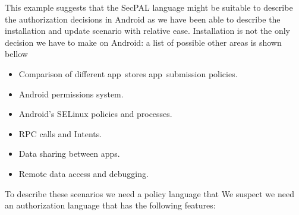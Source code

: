 \documentclass[a4paper]{article}
\begin{document}
This example suggests that the SecPAL language might be suitable to describe the
authorization decisions in Android as we have been able to describe the
installation and update scenario with relative ease.  Installation is not the
only decision we have to make on Android: a list of possible other areas is
shown bellow

\begin{itemize}
  \item Comparison of different app~stores app~submission policies.
  \item Android permissions system.
  \item Android's SELinux policies and processes.
  \item \ac{RPC} calls and Intents.
  \item Data sharing between apps.
  \item Remote data access and debugging.
\end{itemize}

To describe these scenarios we need a policy language that 
We suspect we need an authorization language that has the following features:
\end{document}
